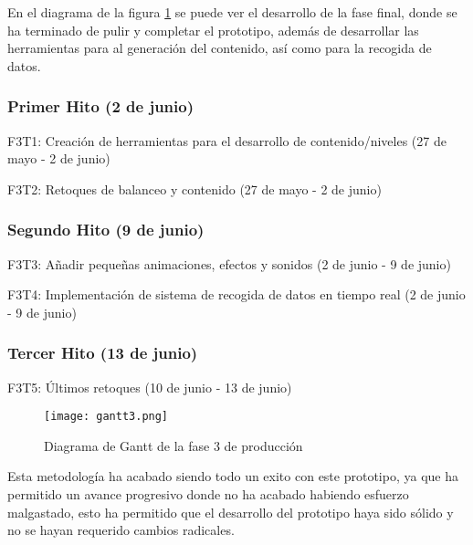En el diagrama de la figura \ref{fig:fase3gantt} se puede ver el desarrollo de la fase final, donde se ha terminado de pulir y completar el prototipo, además de desarrollar las herramientas para al 
generación del contenido, así como para la recogida de datos.

\subsubsection{Primer Hito (2 de junio)}

\begin{compactitem}
\item F3T1: Creación de herramientas para el desarrollo de contenido/niveles (27 de mayo - 2 de junio)
\item F3T2: Retoques de balanceo y contenido (27 de mayo - 2 de junio)
\end{compactitem}

\subsubsection{Segundo Hito (9 de junio)}

\begin{compactitem}
\item F3T3: Añadir pequeñas animaciones, efectos y sonidos (2 de junio - 9 de junio)
\item F3T4: Implementación de sistema de recogida de datos en tiempo real (2 de junio - 9 de junio)
\end{compactitem}

\subsubsection{Tercer Hito (13 de junio)}

\begin{compactitem}
  \item F3T5: Últimos retoques (10 de junio - 13 de junio)
\end{compactitem}

\begin{figure}[H]
  \centering
	\texttt{[image: gantt3.png]}
  \caption{Diagrama de Gantt de la fase 3 de producción}
  \label{fig:fase3gantt}
\end{figure}

Esta metodología ha acabado siendo todo un exito con este prototipo, ya que ha permitido un avance progresivo donde no ha acabado habiendo esfuerzo malgastado, esto ha permitido que el desarrollo del prototipo haya sido sólido y no se hayan requerido cambios radicales.